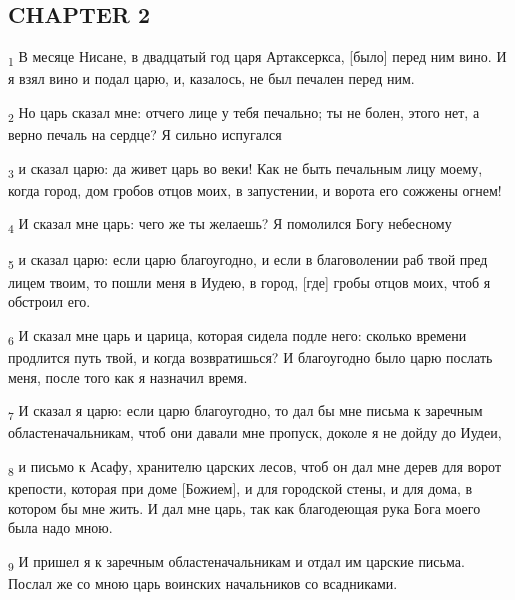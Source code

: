 \subsection{CHAPTER 2}
\begin{tcolorbox}
\textsubscript{1} В месяце Нисане, в двадцатый год царя Артаксеркса, [было] перед ним вино. И я взял вино и подал царю, и, казалось, не был печален перед ним.
\end{tcolorbox}
\begin{tcolorbox}
\textsubscript{2} Но царь сказал мне: отчего лице у тебя печально; ты не болен, этого нет, а верно печаль на сердце? Я сильно испугался
\end{tcolorbox}
\begin{tcolorbox}
\textsubscript{3} и сказал царю: да живет царь во веки! Как не быть печальным лицу моему, когда город, дом гробов отцов моих, в запустении, и ворота его сожжены огнем!
\end{tcolorbox}
\begin{tcolorbox}
\textsubscript{4} И сказал мне царь: чего же ты желаешь? Я помолился Богу небесному
\end{tcolorbox}
\begin{tcolorbox}
\textsubscript{5} и сказал царю: если царю благоугодно, и если в благоволении раб твой пред лицем твоим, то пошли меня в Иудею, в город, [где] гробы отцов моих, чтоб я обстроил его.
\end{tcolorbox}
\begin{tcolorbox}
\textsubscript{6} И сказал мне царь и царица, которая сидела подле него: сколько времени продлится путь твой, и когда возвратишься? И благоугодно было царю послать меня, после того как я назначил время.
\end{tcolorbox}
\begin{tcolorbox}
\textsubscript{7} И сказал я царю: если царю благоугодно, то дал бы мне письма к заречным областеначальникам, чтоб они давали мне пропуск, доколе я не дойду до Иудеи,
\end{tcolorbox}
\begin{tcolorbox}
\textsubscript{8} и письмо к Асафу, хранителю царских лесов, чтоб он дал мне дерев для ворот крепости, которая при доме [Божием], и для городской стены, и для дома, в котором бы мне жить. И дал мне царь, так как благодеющая рука Бога моего была надо мною.
\end{tcolorbox}
\begin{tcolorbox}
\textsubscript{9} И пришел я к заречным областеначальникам и отдал им царские письма. Послал же со мною царь воинских начальников со всадниками.
\end{tcolorbox}
